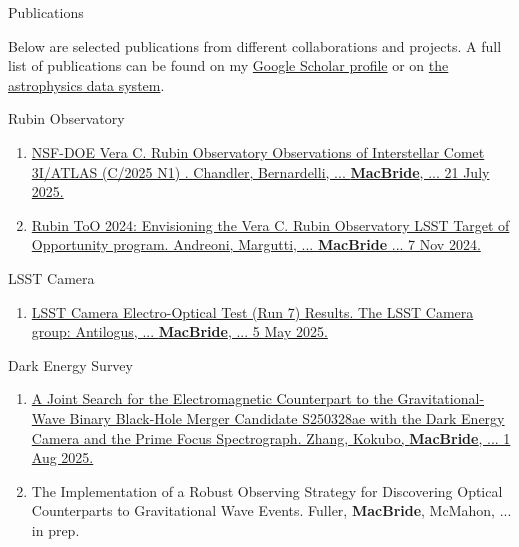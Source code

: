 \documentclass{resume} %
\begin{document}
\begin{rSection}{Publications}


Below are selected publications from different collaborations and projects. A full list of publications can be found on my \href{https://scholar.google.com/citations?user=XtRTswUAAAAJ&hl=en}{Google Scholar profile} or on \href{https://ui.adsabs.harvard.edu/search/fq=\%7B!type\%3Daqp\%20v\%3D\%24fq_database\%7D&fq_database=(database\%3Aastronomy\%20OR\%20database\%3Aphysics)&p_=0&q=((\%20author\%3A\%22Macbride\%2C\%20Sean\%22)\%20AND\%20year\%3A2019-2150)&sort=date\%20desc\%2C\%20bibcode\%20desc}{the astrophysics data system}.

    \begin{rSubsection}{Rubin Observatory}{}{}{} %
        \begin{enumerate}
        \item \href{https://arxiv.org/pdf/2507.13409}{NSF-DOE Vera C. Rubin Observatory Observations of Interstellar Comet 3I/ATLAS (C/2025 N1) . Chandler, Bernardelli, ... \textbf{MacBride}, ... 21 July 2025.} 
        \item \href{https://arxiv.org/abs/2411.04793}{Rubin ToO 2024: Envisioning the Vera C. Rubin Observatory LSST Target of Opportunity program. Andreoni, Margutti, ... \textbf{MacBride} ... 7 Nov 2024.} 
        \end{enumerate}
            
    \end{rSubsection} 
    \begin{rSubsection}{LSST Camera}{}{}{}
        \begin{enumerate}
            \item \href{https://sitcomtn-148.lsst.io/}{LSST Camera Electro-Optical Test (Run 7) Results. The LSST Camera group: Antilogus, ... \textbf{MacBride}, ... 5 May 2025.} 
        \end{enumerate}
    \end{rSubsection}
    
    \begin{rSubsection}{Dark Energy Survey}{}{}{} %
        \begin{enumerate}
            \item \href{https://arxiv.org/abs/2508.00291}{A Joint Search for the Electromagnetic Counterpart to the Gravitational-Wave Binary Black-Hole Merger Candidate S250328ae with the Dark Energy Camera and the Prime Focus Spectrograph. Zhang, Kokubo, \textbf{MacBride}, ... 1 Aug 2025.} 
            \item The Implementation of a Robust Observing Strategy for Discovering Optical Counterparts to Gravitational Wave Events. Fuller, \textbf{MacBride}, McMahon, ... in prep.
            

\end{enumerate}
\end{rSubsection}
\end{rSection}
\end{document}
